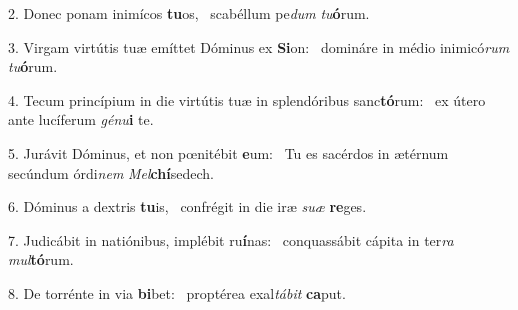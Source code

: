 2. Donec ponam inimícos \textbf{tu}os, \ast\  scabéllum pe\textit{dum} \textit{tu}\textbf{ó}rum.\

3. Virgam virtútis tuæ emíttet Dóminus ex \textbf{Si}on: \ast\  domináre in médio inimicó\textit{rum} \textit{tu}\textbf{ó}rum.\

4. Tecum princípium in die virtútis tuæ in splendóribus sanc\textbf{tó}rum: \ast\  ex útero ante lucíferum \textit{gé}\textit{nu}\textbf{i} te.\

5. Jurávit Dóminus, et non pœnitébit \textbf{e}um: \ast\  Tu es sacérdos in ætérnum secúndum órdi\textit{nem} \textit{Mel}\textbf{chí}sedech.\

6. Dóminus a dextris \textbf{tu}is, \ast\  confrégit in die iræ \textit{su}\textit{æ} \textbf{re}ges.\

7. Judicábit in natiónibus, implébit ru\textbf{í}nas: \ast\  conquassábit cápita in ter\textit{ra} \textit{mul}\textbf{tó}rum.\

8. De torrénte in via \textbf{bi}bet: \ast\  proptérea exal\textit{tá}\textit{bit} \textbf{ca}put.\

